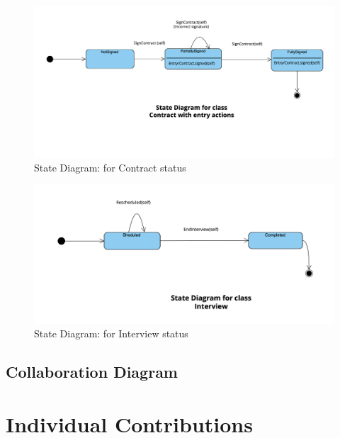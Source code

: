 \documentclass{scrreprt}
\begin{document}
\begin{figure}[H]
	\centering
	\includegraphics[width=\textwidth]{ST/ST2.png}
	\caption{State Diagram: for Contract status}
	\label{fig:ST2}
\end{figure}

\begin{figure}[H]
	\centering
	\includegraphics[width=\textwidth]{ST/ST3.png}
	\caption{State Diagram: for Interview status}
	\label{fig:ST3}
\end{figure}

\section{Collaboration Diagram}


\chapter{Individual Contributions}
\vspace{2cm}
\end{document}
